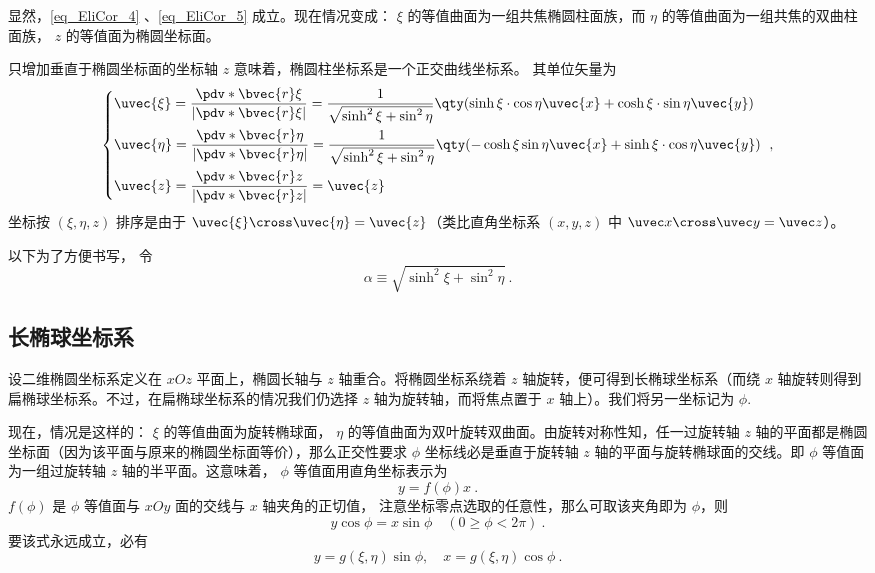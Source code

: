 显然，\autoref{eq_EliCor_4} 、\autoref{eq_EliCor_5} 成立。现在情况变成： $\xi$ 的等值曲面为一组共焦椭圆柱面族，而 $\eta$ 的等值曲面为一组共焦的双曲柱面族， $z$ 的等值面为椭圆坐标面。

只增加垂直于椭圆坐标面的坐标轴 $z$ 意味着，椭圆柱坐标系是一个正交曲线坐标系。 其单位矢量为
\begin{equation}
\left\{
    \begin{aligned}
    &\uvec{\xi}=\frac{\pdv*{\bvec{r}}{\xi}}{|\pdv*{\bvec{r}}{\xi}|}=\frac{1}{\sqrt{\sinh^2\xi+\sin^2\eta}}\qty(\sinh\xi\cdot\cos\eta\uvec{x}+\cosh\xi\cdot\sin\eta\uvec{y})\\
    &\uvec{\eta }=\frac{\pdv*{\bvec{r}}{\eta}}{|\pdv*{\bvec{r}}{\eta}|}=\frac{1}{\sqrt{\sinh^2\xi+\sin^2\eta}}\qty(-\cosh\xi\sin\eta\uvec{x}+\sinh\xi\cdot\cos\eta\uvec{y})\\
    &\uvec{z}=\frac{\pdv*{\bvec{r}}{z}}{|\pdv*{\bvec{r}}{z}|}=\uvec{z}
    \end{aligned}\right.~,
\end{equation}
坐标按 $(\xi,\eta,z)$ 排序是由于 $\uvec{\xi}\cross\uvec{\eta}=\uvec{z}$（类比直角坐标系 $(x,y,z)$ 中 $\uvec x\cross\uvec y=\uvec z$）。

以下为了方便书写， 令
\begin{equation}
\alpha \equiv \sqrt{\sinh^2\xi+\sin^2\eta}~.
\end{equation}

\subsection{长椭球坐标系}
设二维椭圆坐标系定义在 $xOz$ 平面上，椭圆长轴与 $z$ 轴重合。将椭圆坐标系绕着 $z$ 轴旋转，便可得到长椭球坐标系（而绕 $x$ 轴旋转则得到扁椭球坐标系。不过，在扁椭球坐标系的情况我们仍选择 $z$ 轴为旋转轴，而将焦点置于 $x$ 轴上）。我们将另一坐标记为 $\phi$.

现在，情况是这样的： $\xi$ 的等值曲面为旋转椭球面， $\eta$ 的等值曲面为双叶旋转双曲面。由旋转对称性知，任一过旋转轴 $z$ 轴的平面都是椭圆坐标面（因为该平面与原来的椭圆坐标面等价），那么正交性要求 $\phi$ 坐标线必是垂直于旋转轴 $z$ 轴的平面与旋转椭球面的交线。即 $\phi$ 等值面为一组过旋转轴 $z$ 轴的半平面。这意味着， $\phi$ 等值面用直角坐标表示为
\begin{equation}
y=f(\phi)x~.
\end{equation}
$f(\phi)$ 是 $\phi$ 等值面与 $xOy$ 面的交线与 $x$ 轴夹角的正切值， 注意坐标零点选取的任意性，那么可取该夹角即为 $\phi$，则
\begin{equation}
y\cos\phi = x\sin\phi\quad(0\geq\phi<2\pi)~.
\end{equation}
要该式永远成立，必有
\begin{equation}\label{eq_EliCor_2}
y = g(\xi,\eta)\sin\phi,\quad
x = g(\xi,\eta)\cos\phi~.
\end{equation}

